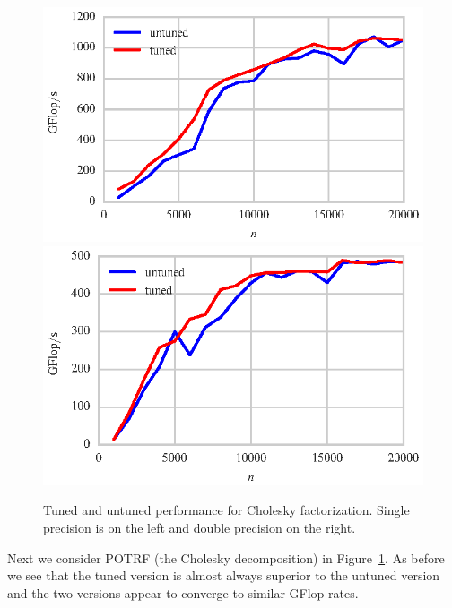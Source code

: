 \documentclass[a4paper,12pt]{article}
\begin{document}
\begin{figure}[ht]
  \centering
  \includegraphics[scale=0.85]{fig/tuned_spotrf.eps}
  \includegraphics[scale=0.85]{fig/tuned_dpotrf.eps}
  \caption{Tuned and untuned performance for Cholesky factorization. Single
    precision is on the left and double precision on the right.
    \label{fig.tuned_potrf} }
\end{figure}

Next we consider POTRF (the Cholesky decomposition)
in Figure~\ref{fig.tuned_potrf}.
As before we see that the tuned version is almost
always superior to the untuned version
and the two versions appear to converge to similar
GFlop rates.
\end{document}
